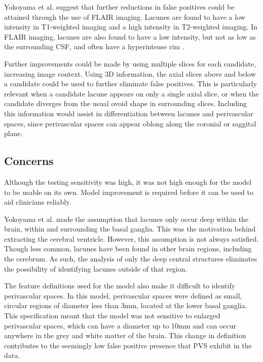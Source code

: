 Yokoyama et al. suggest that further reductions in false positives could be attained through the use of FLAIR imaging. Lacunes are found to have a low intensity in T1-weighted imaging and a high intensity in T2-weighted imaging. In FLAIR imaging, lacunes are also found to have a low intensity, but not as low as the surrounding CSF, and often have a hyperintense rim \cite{WardlawJ.M.2013Nsfr}. 

Further improvements could be made by using multiple slices for each candidate, increasing image context. Using 3D information, the axial slices above and below a candidate could be used to further eliminate false positives. This is particularly relevant when a candidate lacune appears on only a single axial slice, or when the candidate diverges from the usual ovoid shape in surrounding slices. Including this information would assist in differentiation between lacunes and perivascular spaces, since perivascular spaces can appear oblong along the coronial or saggital plane.

\subsection*{Concerns}

Although the testing sensitivity was high, it was not high enough for the model to be usable on its own. Model improvement is required before it can be used to aid clinicians reliably.

Yokoyama et al. made the assumption that lacunes only occur deep within the brain, within and surrounding the basal ganglia. This was the motivation behind extracting the cerebral ventricle. However, this assumption is not always satisfied. Though less common, lacunes have been found in other brain regions, including the cerebrum. As such, the analysis of only the deep central structures eliminates the possibility of identifying lacunes outside of that region.

The feature definitions used for the model also make it difficult to identify perivascular spaces. In this model, perivascular spaces were defined as small, circular regions of diameter less than 3mm, located at the lower basal ganglia. This specification meant that the model was not sensitive to enlarged perivascular spaces, which can have a diameter up to 10mm and can occur anywhere in the grey and white matter of the brain. This change in definition contributes to the seemingly low false positive presence that PVS exhibit in the data.

